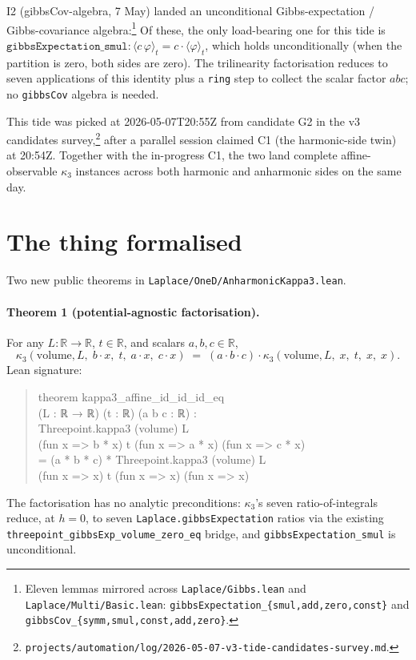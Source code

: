 \documentclass[11pt]{article}
\begin{document}
I2 (gibbsCov-algebra, 7 May) landed an unconditional Gibbs-expectation /
Gibbs-covariance algebra:\footnote{Eleven lemmas mirrored across
\texttt{Laplace/Gibbs.lean} and \texttt{Laplace/Multi/Basic.lean}:
\texttt{gibbsExpectation\_\{smul,add,zero,const\}} and
\texttt{gibbsCov\_\{symm,smul,const,add,zero\}}.} Of these, the only
load-bearing one for this tide is
$\texttt{gibbsExpectation\_smul} : \langle c\,\varphi\rangle_t = c \cdot \langle \varphi\rangle_t$,
which holds unconditionally (when the partition is zero, both sides are
zero). The trilinearity factorisation reduces to seven applications of
this identity plus a \texttt{ring} step to collect the scalar factor
$abc$; no \texttt{gibbsCov} algebra is needed.

This tide was picked at 2026-05-07T20:55Z from candidate G2 in the v3
candidates survey,\footnote{\texttt{projects/automation/log/2026-05-07-v3-tide-candidates-survey.md}.}
after a parallel session claimed C1 (the harmonic-side twin) at 20:54Z.
Together with the in-progress C1, the two land complete affine-observable
$\kappa_3$ instances across both harmonic and anharmonic sides on the
same day.

\section{The thing formalised}

Two new public theorems in \texttt{Laplace/OneD/AnharmonicKappa3.lean}.

\paragraph{Theorem 1 (potential-agnostic factorisation).} For any
$L : \mathbb{R} \to \mathbb{R}$, $t \in \mathbb{R}$, and scalars
$a, b, c \in \mathbb{R}$,
\[
  \kappa_3(\mathrm{volume}, L,\; b \cdot x,\; t,\; a \cdot x,\; c \cdot x)
  \;=\;
  (a \cdot b \cdot c) \cdot \kappa_3(\mathrm{volume}, L,\; x,\; t,\; x,\; x).
\]
Lean signature:
\begin{quote}\small\ttfamily
theorem kappa3\_affine\_id\_id\_id\_eq\\
\hspace*{1em}(L : ℝ → ℝ) (t : ℝ) (a b c : ℝ) :\\
\hspace*{1em}Threepoint.kappa3 (volume) L\\
\hspace*{3em}(fun x => b * x) t (fun x => a * x) (fun x => c * x)\\
\hspace*{1em}= (a * b * c) * Threepoint.kappa3 (volume) L\\
\hspace*{6em}(fun x => x) t (fun x => x) (fun x => x)
\end{quote}
The factorisation has no analytic preconditions: $\kappa_3$'s seven
ratio-of-integrals reduce, at $h = 0$, to seven
\texttt{Laplace.gibbsExpectation} ratios via the existing
\texttt{threepoint\_gibbsExp\_volume\_zero\_eq} bridge, and
\texttt{gibbsExpectation\_smul} is unconditional.
\end{document}
